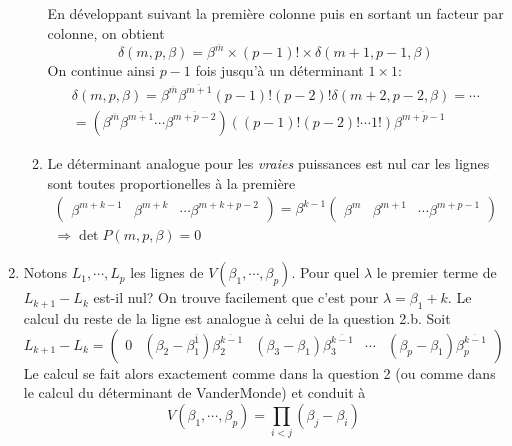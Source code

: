 \begin{enumerate}
\begin{enumerate}
\begin{displaymath}
\end{displaymath}
En développant suivant la première colonne puis en sortant un facteur par colonne, on obtient
\begin{displaymath}
\delta(m,p,\beta)=  \beta^{\overline{m}}\times (p-1)!\times \delta(m+1,p-1,\beta)
\end{displaymath}
On continue ainsi $p-1$ fois jusqu'à un déterminant $1\times 1$:
\begin{multline*}
\delta(m,p,\beta)=  \beta^{\overline{m}}\beta^{\overline{m+1}}(p-1)!(p-2)!\delta(m+2,p-2,\beta)
= \cdots \\
= \left(\beta^{\overline{m}}\beta^{\overline{m+1}}\cdots \beta^{\overline{m+p-2}} \right)
\left((p-1)!(p-2)!\cdots 1! \right) \beta^{\overline{m+p-1}}  
\end{multline*}

 \item Le déterminant analogue pour les \emph{vraies} puissances est nul car les lignes sont toutes proportionelles à la première
\begin{multline*}
 \begin{pmatrix}
  \beta^{m+k-1} & \beta^{m+k} & \cdots \beta^{m+k+p-2} 
 \end{pmatrix}
=\beta^{k-1}
\begin{pmatrix}
  \beta^{m} & \beta^{m+1} & \cdots \beta^{m+p-1} 
 \end{pmatrix} \\
\Rightarrow \det P(m,p,\beta)=0
\end{multline*}
\end{enumerate}

 \item Notons $L_1,\cdots, L_p$ les lignes de $V(\beta_1,\cdots,\beta_p)$. Pour quel $\lambda$ le premier terme de $L_{k+1}-L_k$ est-il nul? On trouve facilement que c'est pour $\lambda = \beta_1 + k$. Le calcul du reste de la ligne est analogue à celui de la question 2.b. Soit
\begin{displaymath}
 L_{k+1}-L_k =
\begin{pmatrix}
 0 & (\beta_2-\beta_1^{\overline{1}})\beta_2^{\overline{k-1}} & (\beta_3-\beta_1)\beta_3^{\overline{k-1}} & \cdots & (\beta_p-\beta_1)\beta_p^{\overline{k-1}}  
\end{pmatrix}
\end{displaymath}
Le calcul se fait alors exactement comme dans la question 2 (ou comme dans le calcul du déterminant de VanderMonde) et conduit à
\begin{displaymath}
 V(\beta_1,\cdots,\beta_p) = \prod _{i<j}(\beta_j - \beta_i)
\end{displaymath}


\end{enumerate}
